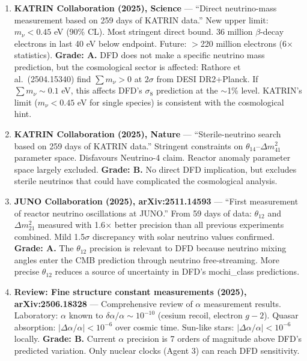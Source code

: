 \documentclass[11pt,a4paper]{article}
\begin{document}
\begin{enumerate}

\item \textbf{KATRIN Collaboration (2025), Science} --- ``Direct neutrino-mass measurement based on 259 days of KATRIN data.'' New upper limit: $m_\nu < 0.45$ eV (90\% CL). Most stringent direct bound. 36 million $\beta$-decay electrons in last 40 eV below endpoint. Future: $>$220 million electrons (6$\times$ statistics). \textbf{Grade: A.} DFD does not make a specific neutrino mass prediction, but the cosmological sector is affected: Rathore et al.\ (2504.15340) find $\sum m_\nu > 0$ at $2\sigma$ from DESI DR2+Planck. If $\sum m_\nu \sim 0.1$ eV, this affects DFD's $\sigma_8$ prediction at the $\sim$1\% level. KATRIN's limit ($m_\nu < 0.45$ eV for single species) is consistent with the cosmological hint.

\item \textbf{KATRIN Collaboration (2025), Nature} --- ``Sterile-neutrino search based on 259 days of KATRIN data.'' Stringent constraints on $\theta_{14}$--$\Delta m_{41}^2$ parameter space. Disfavours Neutrino-4 claim. Reactor anomaly parameter space largely excluded. \textbf{Grade: B.} No direct DFD implication, but excludes sterile neutrinos that could have complicated the cosmological analysis.

\item \textbf{JUNO Collaboration (2025), arXiv:2511.14593} --- ``First measurement of reactor neutrino oscillations at JUNO.'' From 59 days of data: $\theta_{12}$ and $\Delta m^2_{21}$ measured with 1.6$\times$ better precision than all previous experiments combined. Mild 1.5$\sigma$ discrepancy with solar neutrino values confirmed. \textbf{Grade: A.} The $\theta_{12}$ precision is relevant to DFD because neutrino mixing angles enter the CMB prediction through neutrino free-streaming. More precise $\theta_{12}$ reduces a source of uncertainty in DFD's mochi\_class predictions.

\item \textbf{Review: Fine structure constant measurements (2025), arXiv:2506.18328} --- Comprehensive review of $\alpha$ measurement results. Laboratory: $\alpha$ known to $\delta\alpha/\alpha \sim 10^{-10}$ (cesium recoil, electron $g-2$). Quasar absorption: $|\Delta\alpha/\alpha| < 10^{-6}$ over cosmic time. Sun-like stars: $|\Delta\alpha/\alpha| < 10^{-6}$ locally. \textbf{Grade: B.} Current $\alpha$ precision is 7 orders of magnitude above DFD's predicted variation. Only nuclear clocks (Agent 3) can reach DFD sensitivity.

\end{enumerate}
\end{document}
